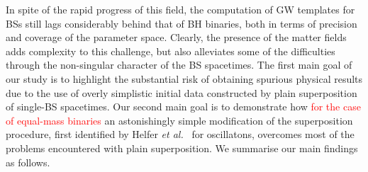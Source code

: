 \documentclass[]{iopart}
\newcommand{\new}[1]{\textcolor{red}{#1}}
\begin{document}
In spite of the rapid progress of this field, the computation of
GW templates for BSs still lags considerably behind that of BH
binaries, both in terms of precision and coverage of the parameter
space.  Clearly, the presence of the matter fields adds complexity
to this challenge, but also alleviates some of the difficulties
through the non-singular character of the BS spacetimes. The first
main goal of our study is to highlight the substantial risk of
obtaining spurious physical results due to the use of overly
simplistic initial data constructed by plain superposition of
single-BS spacetimes. Our second main goal is to demonstrate how
\new{for the case of equal-mass binaries}
an astonishingly simple modification of the superposition procedure,
first identified by Helfer {\it et al.}~\cite{Helfer:2018vtq} for
oscillatons, overcomes most of the problems encountered with plain
superposition. We summarise our main findings as follows.
%
\end{document}

